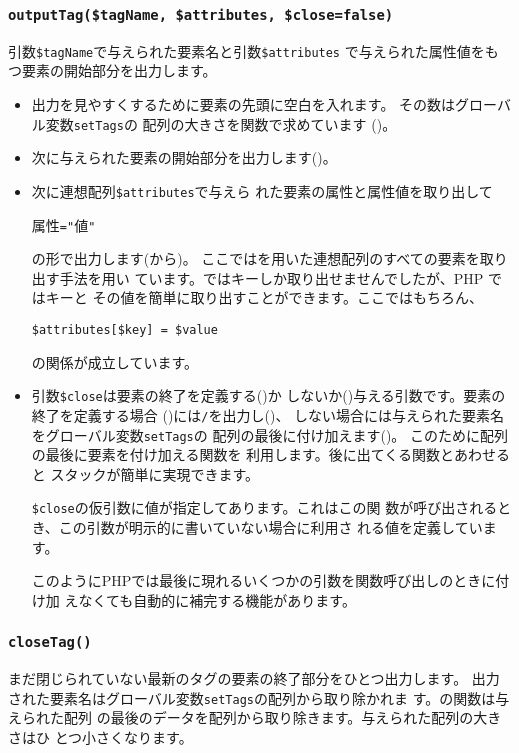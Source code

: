 \subsubsection{\texttt{outputTag(\$tagName, \$attributes, \$close=false)}}
       引数\texttt{\$tagName}で与えられた要素名と引数\texttt{\$attributes}
       で与えられた属性値をもつ要素の開始部分を出力します。
\begin{itemize}
 \item 出力を見やすくするために要素の先頭に空白を入れます。
       その数はグローバル変数\texttt{setTags}の
       配列の大きさを関数で求めています
       ()。
 \item 次に与えられた要素の開始部分を出力します()。
 \item 次に{連想配列}\texttt{\$attributes}で与えら
       れた要素の属性と属性値を取り出して
\begin{center}
 属性\texttt{="}値\texttt{"}
\end{center}
の形で出力します(から)。
 ここではを用いた連想配列のすべての要素を取り出す手法を用い
       ています。\JS ではキーしか取り出せませんでしたが、PHP ではキーと
       その値を簡単に取り出すことができます。ここではもちろん、
\begin{center}
 \texttt{\$attributes[\$key] = \$value}
\end{center}
の関係が成立しています。
 \item 引数\texttt{\$close}は要素の終了を定義する()か
       しないか()与える引数です。要素の終了を定義する場合
       ()には\texttt{/}を出力し()、
       しない場合には与えられた要素名をグローバル変数\texttt{setTags}の
       配列の最後に付け加えます()。
       このために配列の最後に要素を付け加える関数を
       利用します。後に出てくる関数とあわせると
       スタックが簡単に実現できます。

\texttt{\$close}の仮引数に値が指定してあります。これはこの関
       数が呼び出されるとき、この引数が明示的に書いていない場合に利用さ
       れる値を定義しています。

このようにPHPでは最後に現れるいくつかの引数を関数呼び出しのときに付け加
       えなくても自動的に補完する機能があります。

 \end{itemize}       
\subsubsection{\texttt{closeTag()}}
       まだ閉じられていない最新のタグの要素の終了部分をひとつ出力します。
       出力
       された要素名はグローバル変数\texttt{setTags}の配列から取り除かれま
       す。の関数は与えられた配列
       の最後のデータを配列から取り除きます。与えられた配列の大きさはひ
       とつ小さくなります。
